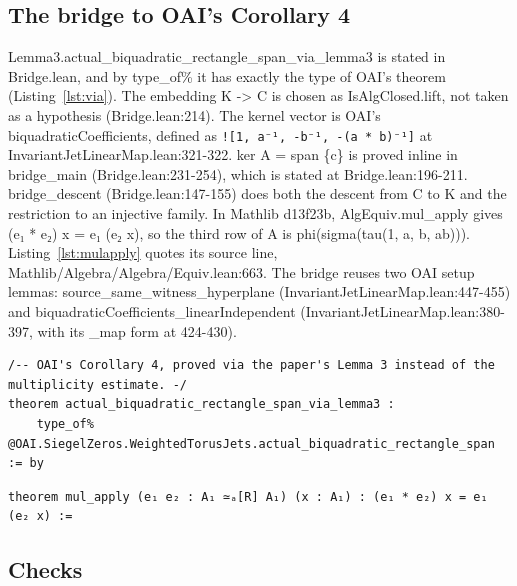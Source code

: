 \subsection{The bridge to OAI's Corollary 4}

Lemma3.actual\_biquadratic\_rectangle\_span\_via\_lemma3 is stated in Bridge.lean, and by type\_of\% it has exactly the type of OAI's theorem (Listing~\ref{lst:via}).
The embedding K -> C is chosen as IsAlgClosed.lift, not taken as a hypothesis (Bridge.lean:214).
The kernel vector is OAI's biquadraticCoefficients, defined as \texttt{![1, a⁻¹, -b⁻¹, -(a * b)⁻¹]} at InvariantJetLinearMap.lean:321-322.
ker A = span \{c\} is proved inline in bridge\_main (Bridge.lean:231-254), which is stated at Bridge.lean:196-211.
bridge\_descent (Bridge.lean:147-155) does both the descent from C to K and the restriction to an injective family.
In Mathlib d13f23b, AlgEquiv.mul\_apply gives (e₁ * e₂) x = e₁ (e₂ x), so the third row of A is phi(sigma(tau(1, a, b, ab))).
Listing~\ref{lst:mulapply} quotes its source line, Mathlib/Algebra/Algebra/Equiv.lean:663.
The bridge reuses two OAI setup lemmas: source\_same\_witness\_hyperplane (InvariantJetLinearMap.lean:447-455) and biquadraticCoefficients\_linearIndependent (InvariantJetLinearMap.lean:380-397, with its \_map form at 424-430).

\begin{listing}[tbp]
\caption{The bridge theorem, lean-checks/\allowbreak comparator-copy/\allowbreak PaperLemma3/\allowbreak Bridge.lean:288-290.}\label{lst:via}
\begin{Verbatim}
/-- OAI's Corollary 4, proved via the paper's Lemma 3 instead of the multiplicity estimate. -/
theorem actual_biquadratic_rectangle_span_via_lemma3 :
    type_of% @OAI.SiegelZeros.WeightedTorusJets.actual_biquadratic_rectangle_span := by
\end{Verbatim}
\end{listing}

\begin{listing}[tbp]
\caption{AlgEquiv.mul\_apply, Mathlib d13f23b Mathlib/\allowbreak Algebra/\allowbreak Algebra/\allowbreak Equiv.lean:663, as copied in results/2026-10-26-claims-ledger/mathlib-algequiv-mul\_apply.txt.}\label{lst:mulapply}
\begin{Verbatim}
theorem mul_apply (e₁ e₂ : A₁ ≃ₐ[R] A₁) (x : A₁) : (e₁ * e₂) x = e₁ (e₂ x) :=
\end{Verbatim}
\end{listing}

\subsection{Checks}

